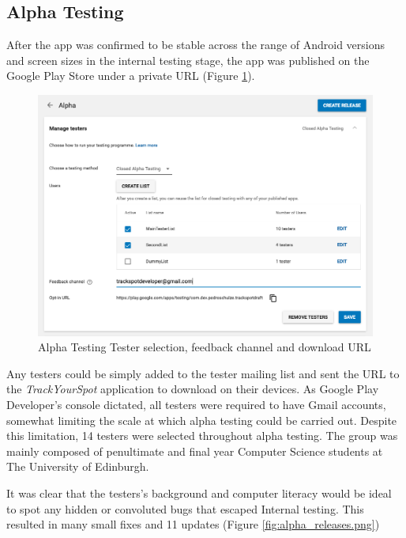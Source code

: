 \subsection{Alpha Testing}
After the app was confirmed to be stable across the range of Android versions and screen sizes in the internal testing stage, the app was published on the Google Play Store under a private URL (Figure \ref{fig:alpha_testers.png}).
\begin{figure}[H]
    \includegraphics[width=1.2\textwidth, center]{figures/alpha_testers.png}
    \caption{Alpha Testing Tester selection, feedback channel and download URL}
    \label{fig:alpha_testers.png}
\end{figure}
Any testers could be simply added to the tester mailing list and sent the URL to the \emph{TrackYourSpot} application to download on their devices. As Google Play Developer's console dictated, all testers were required to have Gmail accounts, somewhat limiting the scale at which alpha testing could be carried out. Despite this limitation, 14 testers were selected throughout alpha testing. The group was mainly composed of penultimate and final year Computer Science students at The University of Edinburgh.
\par It was clear that the testers's background and computer literacy would be ideal to spot any hidden or convoluted bugs that escaped Internal testing. This resulted in many small fixes and 11 updates (Figure \ref{fig:alpha_releases.png})
